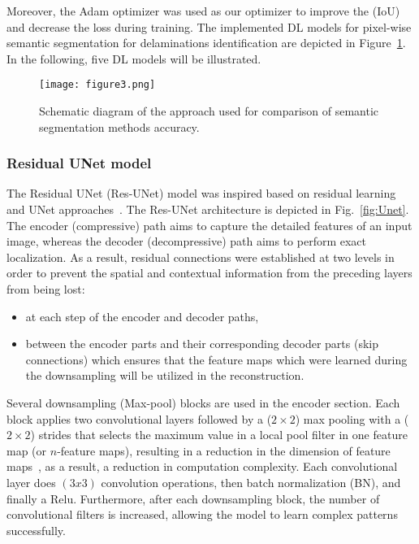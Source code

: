 Moreover, the Adam optimizer was used as our optimizer to improve the (IoU) and decrease the loss during training.
The implemented DL models for pixel-wise semantic segmentation for delaminations identification are depicted in Figure~\ref{fig:flowchart}.
In the following, five DL models will be illustrated.
\begin{figure} [h!]
	\begin{center}
		\texttt{[image: figure3.png]}
	\end{center}
	\caption{Schematic diagram of the approach used for comparison of semantic segmentation methods accuracy.} 
	\label{fig:flowchart}
\end{figure}
\subsubsection{Residual UNet model}
The Residual UNet (Res-UNet) model was inspired based on residual learning~\cite{He2016} and UNet approaches~\cite{Ronneberger2015}.
The Res-UNet architecture is depicted in Fig.~\ref{fig:Unet}.
The encoder (compressive) path aims to capture the detailed features of an input image, whereas the decoder (decompressive) path aims to perform exact localization.
As a result, residual connections were established at two levels in order to prevent the spatial and contextual information from the preceding layers from being lost:
\begin{itemize}
	\item at each step of the encoder and decoder paths,
	\item between the encoder parts and their corresponding decoder parts (skip connections) which ensures that the feature maps which were learned during the downsampling will be utilized in the reconstruction. 
\end{itemize}

Several downsampling (Max-pool) blocks are used in the encoder section.
Each block applies two convolutional layers followed by a (\(2\times2\)) max pooling with a (\(2\times2\)) strides that selects the maximum value in a local pool filter in one feature map (or \(n\)-feature maps), resulting in a reduction in the dimension of feature maps~\cite{Lecun2015}, as a result, a reduction in computation complexity.
Each convolutional layer does \((3x3)\) convolution operations, then batch normalization (BN), and finally a Relu.
Furthermore, after each downsampling block, the number of convolutional filters is increased, allowing the model to learn complex patterns successfully.

